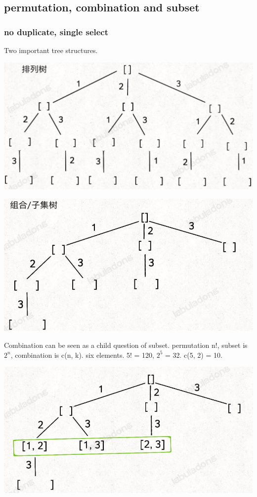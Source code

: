 \documentclass[a4paper,11pt,twoside]{book}
\begin{document}
\subsection{permutation, combination and subset}
\subsubsection{no duplicate, single select}

	\par Two important tree structures.
\begin{center}
	\includegraphics[width=0.7\linewidth]{pics/per}
\end{center}

\begin{center}
	\includegraphics[width=0.7\linewidth]{pics/com}
\end{center}	
	

	\par Combination can be seen as a child question of subset.  permutation n!,  subset is $2^n$,  combination is c(n, k). six elements.  5! = 120,  $2^5$ = 32.  c(5, 2) = 10. 
	
	\begin{center}
		\includegraphics[width=0.7\linewidth]{pics/subset}
	\end{center}
	
\end{document}
